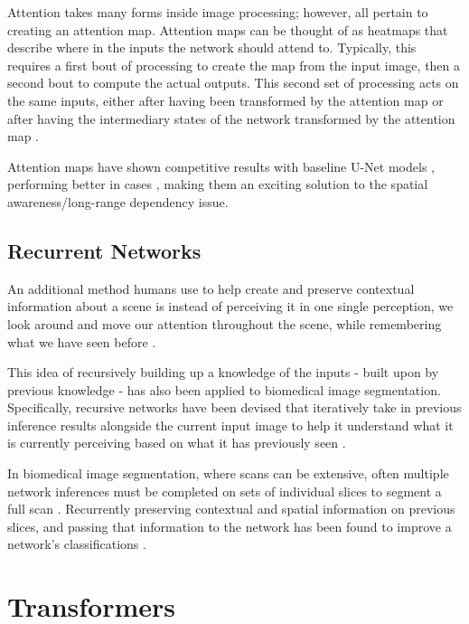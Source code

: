 \documentclass{l4proj}
\begin{document}
Attention takes many forms inside image processing; however, all pertain to creating an attention map. Attention maps can be thought of as heatmaps that describe where in the inputs the network should attend to. Typically, this requires a first bout of processing to create the map from the input image, then a second bout to compute the actual outputs. This second set of processing acts on the same inputs, either after having been transformed by the attention map \citep{wang2019abdominal} or after having the intermediary states of the network transformed by the attention map \citep{kaul2019focusnet, zhang2019attention}.

Attention maps have shown competitive results with baseline U-Net models \citep{kaul2019focusnet}, performing better in cases \citep{sinha2020multi}, making them an exciting solution to the spatial awareness/long-range dependency issue.

\subsection{Recurrent Networks} \label{sec:recurrent}

An additional method humans use to help create and preserve contextual information about a scene is instead of perceiving it in one single perception, we look around and move our attention throughout the scene, while remembering what we have seen before  \citep{wang2019recurrent}.

This idea of recursively building up a knowledge of the inputs - built upon by previous knowledge - has also been applied to biomedical image segmentation. Specifically, recursive networks have been devised that iteratively take in previous inference results alongside the current input image to help it understand what it is currently perceiving based on what it has previously seen \citep{wang2019recurrent}.

In biomedical image segmentation, where scans can be extensive, often multiple network inferences must be completed on sets of individual slices to segment a full scan \citep{cao2023swin}. Recurrently preserving contextual and spatial information on previous slices, and passing that information to the network has been found to improve a network’s classifications \citep{mosinska2018beyond}.

\section{Transformers} \label{sec:transformers}
\end{document}
